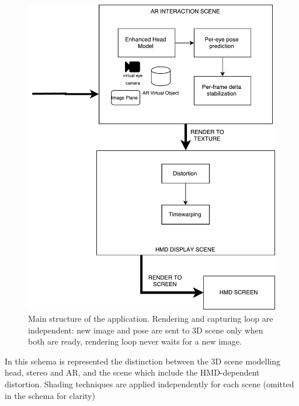\begin{figure}[h!]
\centering
\includegraphics[width=\linewidth]{schemas/rendering_schema}
\caption{Main structure of the application. Rendering and capturing loop are independent: new image and pose are sent to 3D scene only when both are ready, rendering loop never waits for a new image.}
\label{fig:rendering_architecture}
\end{figure}
In this schema is represented the distinction between the 3D scene modelling head, stereo and AR, and the scene which include the HMD-dependent distortion. Shading techniques are applied independently for each scene (omitted in the schema for clarity)


